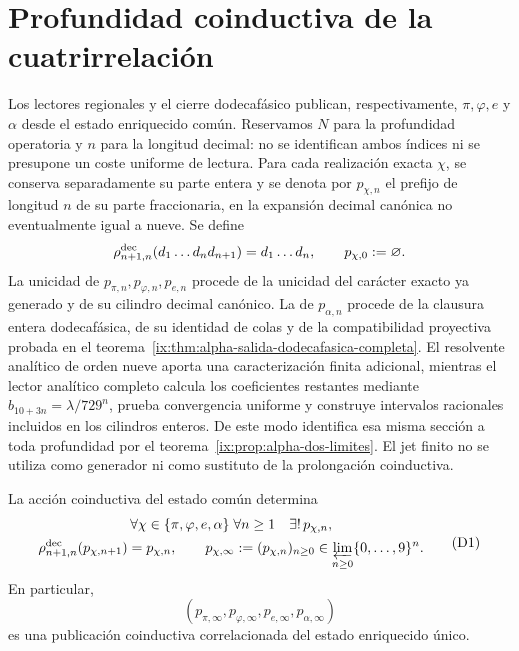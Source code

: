 \section{Profundidad coinductiva de la cuatrirrelación}
\label{ix:sec:profundidad-cuatrirrelacion-ch}

Los lectores regionales y el cierre dodecafásico publican, respectivamente,
\(\pi,\varphi,e\) y \(\alpha\) desde el estado enriquecido común. Reservamos
\(N\) para la profundidad operatoria y \(n\) para la longitud decimal:
no se identifican ambos índices ni se presupone un coste uniforme de lectura.
Para cada realización exacta \(\chi\), se conserva separadamente su parte
entera y se denota por \(p_{\chi,n}\) el prefijo de longitud \(n\) de su
parte fraccionaria, en la expansión decimal canónica no eventualmente igual
a nueve. Se define
\[
 \rho^{\rm dec}_{n+1,n}(d_1\ldots d_nd_{n+1})=d_1\ldots d_n,
 \qquad p_{\chi,0}:=\varnothing.
\]
La unicidad de \(p_{\pi,n},p_{\varphi,n},p_{e,n}\) procede de la unicidad del
carácter exacto ya generado y de su cilindro decimal canónico. La de
\(p_{\alpha,n}\) procede de la clausura entera dodecafásica, de su identidad
de colas y de la compatibilidad proyectiva probada en el
teorema~\ref{ix:thm:alpha-salida-dodecafasica-completa}. El resolvente analítico
de orden nueve aporta una caracterización finita adicional, mientras el
lector analítico completo calcula los coeficientes restantes mediante
\(b_{10+3n}=\lambda/729^n\), prueba convergencia uniforme y construye
intervalos racionales incluidos en los cilindros enteros. De este modo
identifica esa misma sección a toda profundidad por el
teorema~\ref{ix:prop:alpha-dos-limites}. El jet finito no se utiliza como
generador ni como sustituto de la prolongación coinductiva.

\begin{theorem}
\label{ix:thm:profundidad-cuatrirrelacion-ch}
La acción coinductiva del estado común determina
\[
 \begin{gathered}
  \forall\chi\in\{\pi,\varphi,e,\alpha\}\;
  \forall n\ge1\quad\exists!\,p_{\chi,n},\\
  \rho^{\rm dec}_{n+1,n}(p_{\chi,n+1})=p_{\chi,n},
  \qquad
  p_{\chi,\infty}:=(p_{\chi,n})_{n\ge0}
  \in\varprojlim_{n\ge0}\{0,\ldots,9\}^{n}.
 \end{gathered}
\tag{D1}
\label{ix:eq:profundidad-cuatrirrelacion-ch}
\]
En particular,
\[
 (p_{\pi,\infty},p_{\varphi,\infty},p_{e,\infty},p_{\alpha,\infty})
\tag{D2}
\label{ix:eq:cuatrirrelacion-infinita-ch}
\]
es una publicación coinductiva correlacionada del estado enriquecido único.
\end{theorem}

